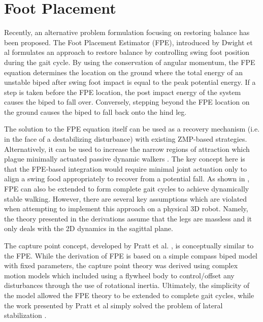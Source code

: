 \section{Foot Placement} %
\label{sec:related_work}
Recently, an alternative problem formulation focusing on restoring balance has been proposed. The Foot Placement Estimator (FPE), introduced by Dwight et al \cite{Wight:2008ii} formulates an approach to restore balance by controlling swing foot position during the gait cycle. By using the conservation of angular momentum, the FPE equation determines the location on the ground where the total energy of an unstable biped after swing foot impact is equal to the peak potential energy. If a step is taken before the FPE location, the post impact energy of the system causes the biped to fall over. Conversely, stepping beyond the FPE location on the ground causes the biped to fall back onto the hind leg.

The solution to the FPE equation itself can be used as a recovery mechanism (i.e. in the face of a destabilizing disturbance) with existing ZMP-based strategies. Alternatively, it can be used to increase the narrow regions of attraction which plague minimally actuated passive dynamic walkers \cite{Goswami:1996gn,Asano:2000wi,Kuo:1999tn}. The key concept here is that the FPE-based integration would require minimal joint actuation only to align a swing food appropriately to recover from a potential fall. As shown in \cite{Wight:2008ii,Wight:2008vt}, FPE can also be extended to form complete gait cycles to achieve dynamically stable walking. However, there are several key assumptions which are violated when attempting to implement this approach on a physical 3D robot. Namely, the theory presented in the derivations assume that the legs are massless and it only deals with the 2D dynamics in the sagittal plane.

The capture point concept, developed by Pratt et al. \cite{Pratt:2006vy}, is conceptually similar to the FPE. While the derivation of FPE is based on a simple compass biped model with fixed parameters, the capture point theory was derived using complex motion models which included using a flywheel body to control/offset any disturbances through the use of rotational inertia. Ultimately, the simplicity of the model allowed the FPE theory to be extended to complete gait cycles, while the work presented by Pratt et al simply solved the problem of lateral stabilization \cite{Wight:2008ii}.

